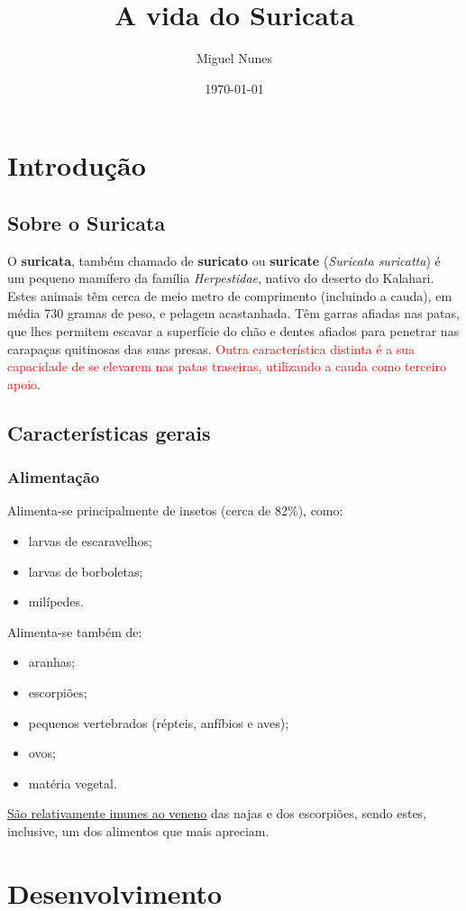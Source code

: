\documentclass[a4paper,10pt]{report}
\title{A vida do Suricata}
\author{Miguel Nunes}
\date{\today}
\begin{document}
\maketitle
\chapter{Introdução}
\section{Sobre o Suricata}
O \textbf{suricata}, também chamado de \textbf{suricato} ou \textbf{suricate} (\textit{Suricata suricatta}) é um pequeno mamífero da família \textit{Herpestidae}, nativo do deserto do Kalahari. Estes animais têm cerca de meio metro de comprimento (incluindo a cauda), em média 730 gramas de peso, e pelagem acastanhada. Têm garras afiadas nas patas, que lhes permitem escavar a superfície do chão e dentes afiados para penetrar nas carapaças quitinosas das suas presas. \textcolor{red}{Outra característica distinta é a sua capacidade de se elevarem nas patas traseiras, utilizando a cauda como terceiro apoio}.
\section{Características gerais}
\subsection{Alimentação}
Alimenta-se principalmente de insetos (cerca de 82\%), como:
\begin{itemize}
\item larvas de escaravelhos;
\item larvas de borboletas;
\item milípedes.
\end{itemize}
Alimenta-se também de:
\begin{itemize}
\item aranhas;
\item escorpiões;
\item pequenos vertebrados (répteis, anfíbios e aves);
\item ovos;
\item matéria vegetal.
\end{itemize}
\uline{São relativamente imunes ao veneno} das najas e dos escorpiões, sendo estes, inclusive, um dos alimentos que mais apreciam.
\chapter{Desenvolvimento}
\end{document}
